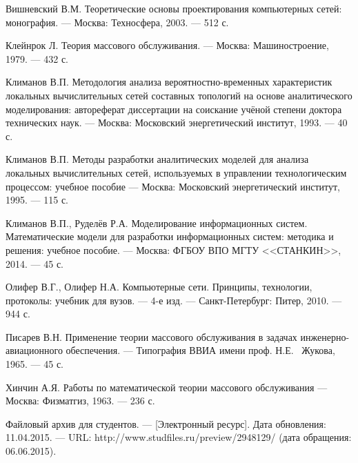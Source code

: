 \documentclass[oneside, final, 14pt, a4paper]{extreport}
\begin{document}
\renewcommand{\bibname}{\centering Список литературы}
\begin{thebibliography}{00}

 Вишневский В.М.
Теоретические основы проектирования компьютерных сетей: монография.
--- Москва: Техносфера, 2003.
--- 512 с.

 Клейнрок Л.
Теория массового обслуживания.
--- Москва: Машиностроение, 1979.
--- 432 с.

 Климанов В.П.
Методология анализа вероятностно-временных характеристик локальных вычислительных сетей составных топологий на основе аналитического
моделирования: автореферат диссертации на соискание учёной степени доктора технических наук.
--- Москва: Московский энергетический институт, 1993.
--- 40 с.

 Климанов В.П.
Методы разработки аналитических моделей для анализа локальных вычислительных сетей, используемых в управлении технологическим процессом: учебное пособие
--- Москва: Московский энергетический институт, 1995.
--- 115 с.

 Климанов В.П., Руделёв Р.А.
Моделирование информационных систем. Математические модели для разработки информационных систем: методика и решения: учебное пособие.
--- Москва: ФГБОУ ВПО МГТУ <<СТАНКИН>>, 2014.
--- 45 с.

 Олифер В.Г., Олифер Н.А.
Компьютерные сети. Принципы, технологии, протоколы: учебник для вузов.
--- 4-е изд.
--- Санкт-Петербург: Питер, 2010.
--- 944 с.

 Писарев В.Н.
Применение теории массового обслуживания в задачах инженерно-авиационного обеспечения.
--- Типография ВВИА имени проф. Н.Е. ~Жукова, 1965.
--- 45 с.

 Хинчин А.Я.
Работы по математической теории массового обслуживания
--- Москва: Физматгиз, 1963.
--- 236 с.

Файловый архив для студентов.
--- [Электронный ресурс]. Дата обновления: 11.04.2015.
--- URL: http://www.studfiles.ru/preview/2948129/ (дата обращения: 06.06.2015).

\end{thebibliography}
\end{document}
